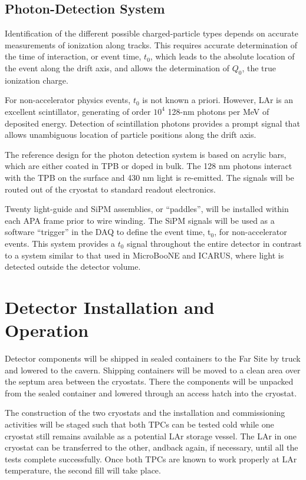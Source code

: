 \subsection{Photon-Detection System}

Identification of the different possible charged-particle types depends on accurate measurements of ionization along tracks. This requires accurate determination of the time of interaction, or event time, $t_0$, which leads to the absolute location of the event along the drift axis, and allows the determination of $Q_0$,  the 
true ionization charge.

For non-accelerator physics events, $t_0$ is not known a priori. However, LAr is an excellent scintillator, generating of order $10^{4}$ 128-nm photons per MeV of deposited energy.  Detection of scintillation photons provides a prompt signal that allows unambiguous location of particle positions along the drift axis.

The reference design for the photon detection system is based on acrylic bars, which are either coated in TPB or doped in bulk. The 128 nm photons interact with the TPB on the surface and 430 nm light is re-emitted. The signals will be routed out of the cryostat to standard readout electronics.

Twenty light-guide and SiPM assemblies, or ``paddles'', will be installed within each APA frame prior to wire winding. The SiPM signals will be used as a software ``trigger'' in the DAQ to define the event time, t$_0$, for non-accelerator events. This system provides a $t_0$ signal throughout the entire detector in contrast to a system similar to that used in MicroBooNE and ICARUS, where light is detected outside the detector volume. 

\section{Detector Installation and Operation}
\label{sec:det-install}

Detector components will be shipped in sealed containers to the Far Site by truck and lowered to the cavern. Shipping containers will be moved to a clean area over the septum area between the cryostats. There the components will be unpacked from the sealed container and lowered  through an access hatch into the cryostat. 

The construction of the two cryostats and the installation and commissioning activities will be staged such that both TPCs can be tested cold while one cryostat still remains available as a potential LAr storage vessel. The LAr in one cryostat can be transferred to the other, andback again, if necessary, until all the tests complete successfully. Once both TPCs are known to work properly at LAr temperature, the second fill will take place.

